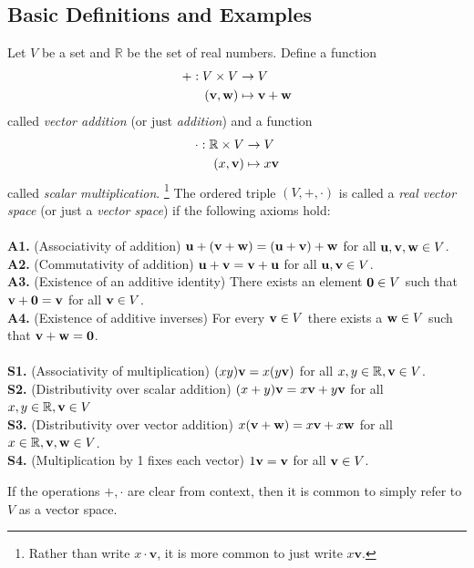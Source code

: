 \documentclass[12pt,letterpaper,reqno]{article}
\numberwithin{equation}{section}
\begin{document}
\subsection{Basic Definitions and Examples}\label{sec:basic_definitions_and_examples}
\begin{defn} \label{def:vector_space}
	Let $V$ be a set and $\mathbb{R}$ be the set of real numbers. Define a function
\begin{align*}
	+:V\times V &\to V \\
	({\bf v},{\bf w}) &\mapsto {\bf v}+{\bf w}
\end{align*}
called \emph{vector addition} (or just \emph{addition}) and a function
\begin{align*}
	\cdot :\mathbb{R}\times V &\to V \\
	(x,{\bf v}) &\mapsto x{\bf v}
\end{align*}
called \emph{scalar multiplication}. \footnote{Rather than write $x \cdot \mathbf{v}$, it is more common to just write $x\mathbf{v}$.} The ordered triple $(V,+,\cdot)$ is called a \emph{real vector space} (or just a \emph{vector space}) if the following axioms hold: \\
\\
{\bf A1.} (Associativity of addition) ${\bf u}+({\bf v}+{\bf w})=({\bf u}+{\bf v})+{\bf w}$ for all  ${\bf u},{\bf v}, {\bf w} \in V$. \\
{\bf A2.} (Commutativity of addition) ${\bf u}+{\bf v}={\bf v}+{\bf u}$ for all ${\bf u}, {\bf v} \in V$. \\
{\bf A3.} (Existence of an additive identity) There exists an element ${\bf 0} \in V$ such that ${\bf v}+{\bf 0}={\bf v}$ for all ${\bf v} \in V$. \\
{\bf A4.} (Existence of additive inverses) For every ${\bf v} \in V$ there exists a ${\bf w} \in V$ such that ${\bf v}+{\bf w}={\bf 0}$. \\
\\
{\bf S1.} (Associativity of multiplication) $(xy){\bf v}=x(y{\bf v})$ for all $x,y \in \mathbb{R}, {\bf v}\in V$. \\
{\bf S2.} (Distributivity over scalar addition) $(x+y){\bf v}=x{\bf v}+y{\bf v}$ for all $x,y \in \mathbb{R}, {\bf v} \in V$ \\
{\bf S3.} (Distributivity over vector addition) $x({\bf v}+{\bf w})=x{\bf v}+x{\bf w}$ for all $x \in \mathbb{R}, {\bf v}, {\bf w} \in V$. \\
{\bf S4.} (Multiplication by 1 fixes each vector) $1{\bf v}={\bf v}$ for all ${\bf v} \in V$. 
\end{defn}
If the operations $+,\cdot$ are clear from context, then it is common to simply refer to $V$ as a vector space.
\end{document}
